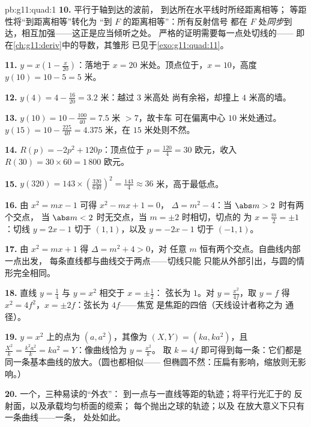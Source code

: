 \begin{solution}{pb:g11:quad:1}
\textbf{10.} 平行于轴到达的波前，
到达所在水平线时所经距离相等；
等距性将“到距离相等”转化为
“到 $F$ 的距离相等”：所有反射信号
都在 $F$ 处\emph{同步}到达，相互加强——这正是应当倾听之处。
严格的证明需要每一点处切线的——
即在\cref{ch:g11:deriv}中的导数，其雏形
已见于\cref{exo:g11:quad:11}。

\textbf{11.} $y = x\left(1 - \frac{x}{20}\right)$：落地于
$x = 20$ 米处。顶点位于，$x = 10$，高度
$y(10) = 10 - 5 = 5$ 米。

\textbf{12.} $y(4) = 4 - \frac{16}{20} = 3.2$ 米：越过 $3$ 米高处
尚有余裕，却撞上 $4$ 米高的墙。

\textbf{13.} $y(10) = 10 - \frac{100}{40} = 7.5$ 米 $> 7$，故卡车
可在偏离中心 $10$ 米处通过。$y(15) = 10 - \frac{225}{40}
= 4.375$ 米，在 $15$ 米处则不然。

\textbf{14.} $R(p) = -2p^2 + 120p$：顶点位于
$p = \frac{120}{4} = 30$ 欧元，收入
$R(30) = 30 \times 60 = 1\,800$ 欧元。

\textbf{15.} $y(320) = 143 \times \left(\frac{320}{640}\right)^2
= \frac{143}{4} \approx 36$ 米，高于最低点。

\textbf{16.} 由 $x^2 = mx - 1$ 可得 $x^2 - mx + 1 = 0$，
$\Delta = m^2 - 4$：当 $\abs m > 2$ 时有两个交点，
当 $\abs m < 2$ 时无交点，当 $m = \pm 2$ 时相切，切点的
为 $x = \frac m2 = \pm 1$：切线 $y = 2x - 1$ 切于 $(1, 1)$，以及
$y = -2x - 1$ 切于 $(-1, 1)$。

\textbf{17.} 由 $x^2 = mx + 1$ 得 $\Delta = m^2 + 4 > 0$，对
任意 $m$ 恒有两个交点。自曲线内部一点出发，
每条直线都与曲线交于两点——切线只能
只能从外部引出，与圆的情形完全相同。

\textbf{18.} 直线 $y = \frac14$ 与 $y = x^2$ 相交于 $x = \pm\frac12$：
弦长为 $1$。对 $y = \frac{x^2}{4f}$，取 $y = f$ 得
$x^2 = 4f^2$，$x = \pm 2f$：弦长为 $4f$——焦宽
是焦距的四倍（天线设计者称之为
通径）。

\textbf{19.}  $y = x^2$ 上的点为 $(a, a^2)$，其像为
$(X, Y) = (ka, ka^2)$，且 $\frac{X^2}{k} = \frac{k^2a^2}{k} =
ka^2 = Y$：像曲线恰为 $y = \frac{x^2}{k}$。
取 $k = 4f$ 即可得到每一条：它们都是
同一条基本曲线的放大。（圆也都相似——
但椭圆不然：压扁有影响，缩放则无影响。）

\textbf{20.} 一个，三种易读的“外衣”：
到一点与一直线等距的轨迹；将平行光汇于的
反射面，以及承载均匀桥面的缆索；
每个抛出之球的轨迹；以及
在放大意义下只有一条曲线——一条，
处处如此。
\end{solution}
